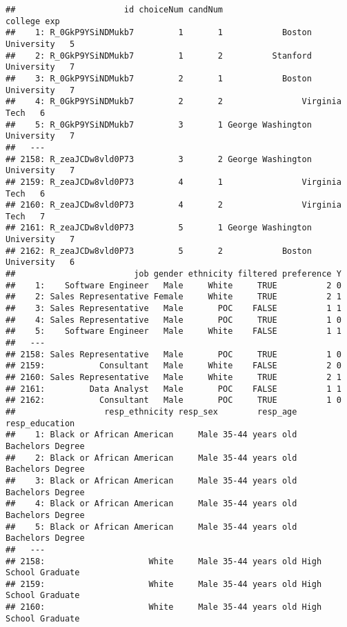 \documentclass[
]{article}
\begin{document}
\begin{verbatim}
##                      id choiceNum candNum                      college exp
##    1: R_0GkP9YSiNDMukb7         1       1            Boston University   5
##    2: R_0GkP9YSiNDMukb7         1       2          Stanford University   7
##    3: R_0GkP9YSiNDMukb7         2       1            Boston University   7
##    4: R_0GkP9YSiNDMukb7         2       2                Virginia Tech   6
##    5: R_0GkP9YSiNDMukb7         3       1 George Washington University   7
##   ---                                                                     
## 2158: R_zeaJCDw8vld0P73         3       2 George Washington University   7
## 2159: R_zeaJCDw8vld0P73         4       1                Virginia Tech   6
## 2160: R_zeaJCDw8vld0P73         4       2                Virginia Tech   7
## 2161: R_zeaJCDw8vld0P73         5       1 George Washington University   7
## 2162: R_zeaJCDw8vld0P73         5       2            Boston University   6
##                        job gender ethnicity filtered preference Y
##    1:    Software Engineer   Male     White     TRUE          2 0
##    2: Sales Representative Female     White     TRUE          2 1
##    3: Sales Representative   Male       POC    FALSE          1 1
##    4: Sales Representative   Male       POC     TRUE          1 0
##    5:    Software Engineer   Male     White    FALSE          1 1
##   ---                                                            
## 2158: Sales Representative   Male       POC     TRUE          1 0
## 2159:           Consultant   Male     White    FALSE          2 0
## 2160: Sales Representative   Male     White     TRUE          2 1
## 2161:         Data Analyst   Male       POC    FALSE          1 1
## 2162:           Consultant   Male       POC     TRUE          1 0
##                  resp_ethnicity resp_sex        resp_age       resp_education
##    1: Black or African American     Male 35-44 years old     Bachelors Degree
##    2: Black or African American     Male 35-44 years old     Bachelors Degree
##    3: Black or African American     Male 35-44 years old     Bachelors Degree
##    4: Black or African American     Male 35-44 years old     Bachelors Degree
##    5: Black or African American     Male 35-44 years old     Bachelors Degree
##   ---                                                                        
## 2158:                     White     Male 35-44 years old High School Graduate
## 2159:                     White     Male 35-44 years old High School Graduate
## 2160:                     White     Male 35-44 years old High School Graduate

\end{verbatim}
\end{document}
